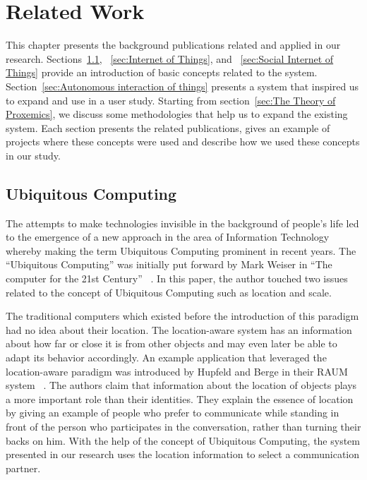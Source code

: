 \chapter{Related Work}
\label{ch:related-work}
This chapter presents the background publications related and applied in our research.
Sections~\ref{sec:Ubiquitous Computing}, ~\ref{sec:Internet of Things}, and ~\ref{sec:Social Internet of Things}
provide an introduction of basic concepts related to the system.
Section~\ref{sec:Autonomous interaction of things} presents a system that inspired us to expand
and use in a user study.
Starting from section~\ref{sec:The Theory of Proxemics}, we discuss some methodologies
that help us to expand the existing system.
Each section presents the related publications, gives an example of projects where these concepts
were used and describe how we used these concepts in our study.

\section{Ubiquitous Computing}
\label{sec:Ubiquitous Computing}
The attempts to make technologies invisible in the background of people’s life led to the emergence
of a new approach in the area of Information Technology whereby making the term
Ubiquitous Computing prominent in recent years.
The “Ubiquitous Computing” was initially put forward by Mark Weiser
in “The computer for the 21st Century” ~\cite{weiser1999computer}.
In this paper, the author touched two issues related to the concept of
Ubiquitous Computing such as location and scale.

The traditional computers which existed before the introduction of this
paradigm had no idea about their location.
The location-aware system has an information about how far or close it is from other
objects and may even later be able to adapt its behavior accordingly.
An example application that leveraged the location-aware paradigm was introduced by
Hupfeld and Berge in their RAUM system ~\cite{hupfeld2000spatially}.
The authors claim that information about the location of objects plays
a more important role than their identities.
They explain the essence of location by giving an example of people who prefer to communicate
while standing in front of the person who participates in the conversation, rather than turning their backs on him.
With the help of the concept of Ubiquitous Computing, the system presented in our
research uses the location information to select a communication partner.

